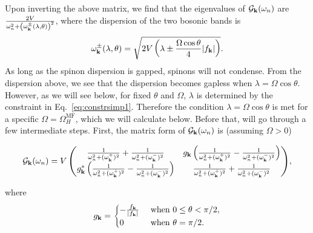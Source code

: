 \documentclass[twocolumn,superscriptaddress,amsmath,amssymb,aps,prx,nofootinbib]{revtex4-2}
\begin{document}
Upon inverting the above matrix, we find that the eigenvalues of $\mathcal{G}_{\vb{k}}(\omega_n)$ are $\frac{2 V}{\omega_n^2 + \left(\omega^{\pm}_{\vb{k}}(\lambda,\theta)\right)^2}$, where the dispersion of the two bosonic bands is
\begin{equation}
    \omega^{\pm}_{\vb{k}}(\lambda,\theta)=\sqrt{2V \left(\lambda \pm \frac{\Omega \cos \theta}{4} \abs{f_{\vb{k}}}\right)}.
\end{equation}
As long as the spinon dispersion is gapped, spinons will not condense. 
From the dispersion above, we see that the dispersion becomes gapless when $\lambda=\Omega \cos \theta$. However, as we will see below, for fixed $\theta$ and $\Omega$, $\lambda$ is determined by the constraint in Eq.~\eqref{eq:constrsimp1}. Therefore the condition $\lambda=\Omega \cos \theta$ is met for a specific $\Omega=\Omega^{\text{MF}}_{H}$, which we will calculate below. Before that, will go through a few intermediate steps. First, the matrix form of $\mathcal{G}_{\vb{k}}(\omega_n)$ is (assuming $\Omega>0$)
\begin{widetext}
\begin{equation}
    \begin{aligned}
        \mathcal{G}_{\vb{k}}(\omega_n)=V \begin{pmatrix}\frac{1}{\omega_n^2 + (\omega^+_{\vb{k}})^2}+\frac{1}{\omega_n^2 + (\omega^-_{\vb{k}})^2}& g_{\vb{k}}\left(\frac{1}{\omega_n^2 + (\omega^+_{\vb{k}})^2}-\frac{1}{\omega_n^2 + (\omega^-_{\vb{k}})^2}\right)\\ g_{\vb{k}}^*\left(\frac{1}{\omega_n^2 + (\omega^+_{\vb{k}})^2}-\frac{1}{\omega_n^2 + (\omega^-_{\vb{k}})^2}\right)&\frac{1}{\omega_n^2 + (\omega^+_{\vb{k}})^2}+\frac{1}{\omega_n^2 + (\omega^-_{\vb{k}})^2}\end{pmatrix}
    \end{aligned},
\end{equation}
\end{widetext}
where
\begin{equation}
g_{\vb{k}}=
\begin{cases}
-\frac{f_{\vb{k}}}{\abs{f_{\vb{k}}}} & \text{ when }0\leq\theta < \pi/2,\\
0 & \text{ when }\theta=\pi/2.
\end{cases}
\end{equation}
\end{document}
